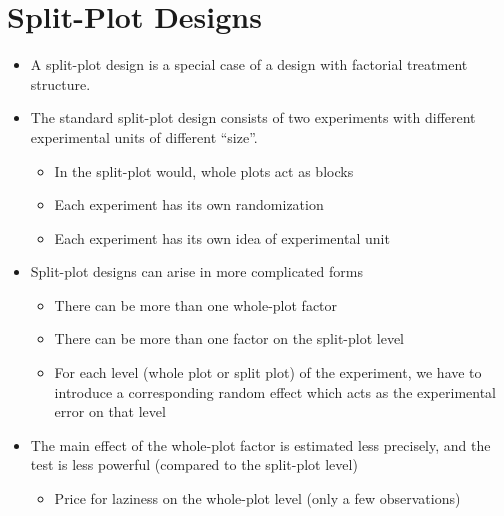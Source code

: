 \documentclass[a4paper]{article}
\begin{document}
\section{Split-Plot Designs}
\begin{itemize}
    \item A split-plot design is a special case of a design with factorial treatment structure.
    \item The standard split-plot design consists of two experiments with different experimental units of different ``size''.
    \begin{itemize}
        \item In the split-plot would, whole plots act as blocks
        \item Each experiment has its own randomization
        \item Each experiment has its own idea of experimental unit
    \end{itemize}
    \item Split-plot designs can arise in more complicated forms
    \begin{itemize}
        \item There can be more than one whole-plot factor
        \item There can be more than one factor on the split-plot level
        \item For each level (whole plot or split plot) of the experiment, we have to introduce a corresponding random effect which acts as the experimental error on that level
    \end{itemize}
    \item The main effect of the whole-plot factor is estimated less precisely, and the test is less powerful (compared to the split-plot level)
    \begin{itemize}
        \item Price for laziness on the whole-plot level (only a few observations)
    \end{itemize}
\end{itemize}
\end{document}
